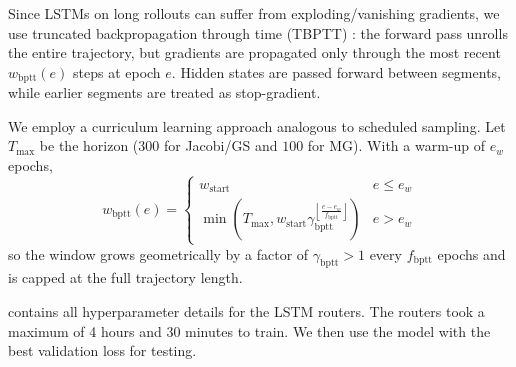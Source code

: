 \documentclass{article} %
\begin{document}
Since LSTMs on long rollouts can suffer from exploding/vanishing gradients, we use truncated backpropagation through time (TBPTT) \citep{mozer2013focused,robinson1987utility,werbos1988generalization}: the forward pass unrolls the entire trajectory, but gradients are propagated only through the most recent $w_{\text{bptt}}(e)$ steps at epoch $e$. Hidden states are passed forward between segments, while earlier segments are treated as stop-gradient.

We employ a curriculum learning approach analogous to scheduled sampling. Let $T_{\max}$ be the horizon ($300$ for Jacobi/GS and $100$ for MG). With a warm-up of $e_w$ epochs,
\begin{equation}
    w_{\text{bptt}}(e)  = 
    \begin{cases}
        w_{\text{start}} & e \leq e_w \\
        \min\left(T_{\max}, w_{\text{start}}\gamma_{\text{bptt}}^{\left\lfloor \frac{e - e_w}{f_{\text{bptt}}}\right\rfloor} \right) & e > e_w
    \end{cases}
\end{equation}
so the window grows geometrically by a factor of $\gamma_{\text{bptt}} > 1$ every $f_{\text{bptt}}$ epochs and is capped at the full trajectory length.

 contains all hyperparameter details for the LSTM routers. The routers took a maximum of 4 hours and 30 minutes to train. We then use the model with the best validation loss for testing. 
\end{document}
